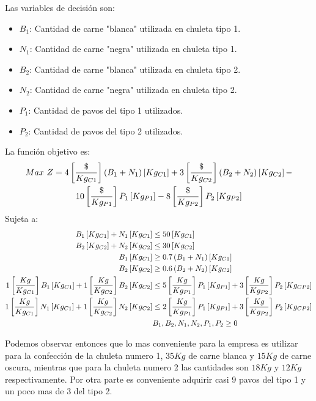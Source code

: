 \documentclass{tarea}
\begin{document}
\begin{homeworkProblem}[-1][Turkeyco]
Las variables de decisión son:
\begin{itemize}
	\item $B_1$: Cantidad de carne "blanca" utilizada en chuleta tipo 1.
	\item $N_1$: Cantidad de carne "negra" utilizada en chuleta tipo 1.
	\item $B_2$: Cantidad de carne "blanca" utilizada en chuleta tipo 2.
	\item $N_2$: Cantidad de carne "negra" utilizada en chuleta tipo 2.
	\item $P_1$: Cantidad de pavos del tipo 1 utilizados.
	\item $P_2$: Cantidad de pavos del tipo 2 utilizados.
\end{itemize}
La función objetivo es: 
\begin{multline}
	Max\ Z = 4\left[ \frac{\$}{Kg_{C1}} \right]\left( B_1 + N_1 \right)\left[ Kg_{C1} \right] +
	 3\left[ \frac{\$}{Kg_{C2}} \right]\left( B_2 + N_2 \right)\left[ Kg_{C2} \right] - \\
	  10\left[ \frac{\$}{Kg_{P1}} \right]P_1\left[ Kg_{P1} \right] -
	  8\left[ \frac{\$}{Kg_{P2}} \right]P_2\left[ Kg_{P2} \right]
\end{multline}
Sujeta a:
\begin{align*}
	B_1\left[ Kg_{C1} \right] + N_1\left[ Kg_{C1} \right] &\le 50\left[ Kg_{C1} \right] \\
	B_2\left[ Kg_{C2} \right] + N_2\left[ Kg_{C2} \right] &\le 30\left[ Kg_{C2} \right] \\
	B_1\left[ Kg_{C1} \right] &\ge 0.7\left( B_1 + N_1 \right)\left[ Kg_{C1} \right] \\
	B_2\left[ Kg_{C2} \right] &\ge 0.6\left( B_2 + N_2 \right)\left[ Kg_{C2} \right] \\
	1\left[ \frac{Kg}{Kg_{C1}} \right]B_1\left[ Kg_{C1} \right] + 1\left[ \frac{Kg}{Kg_{C2}} \right]B_2\left[ Kg_{C2} \right] &\le 5\left[ \frac{Kg}{Kg_{P1}} \right]P_1\left[ Kg_{P1} \right] + 3\left[ \frac{Kg}{Kg_{P2}} \right]P_2\left[ Kg_{CP2} \right]\\
	1\left[ \frac{Kg}{Kg_{C1}} \right]N_1\left[ Kg_{C1} \right] + 1\left[ \frac{Kg}{Kg_{C2}} \right]N_2\left[ Kg_{C2} \right] &\le 2\left[ \frac{Kg}{Kg_{P1}} \right]P_1\left[ Kg_{P1} \right] + 3\left[ \frac{Kg}{Kg_{P2}} \right]P_2\left[ Kg_{CP2} \right]\\
	&B_1,B_2,N_1,N_2,P_1,P_2 \ge 0
\end{align*}

Podemos observar entonces que lo mas conveniente para la empresa es utilizar para la confección de la chuleta numero 1, $35Kg$ de carne blanca y $15Kg$ de carne oscura, mientras que para la chuleta numero 2 las cantidades son $18Kg$ y $12Kg$ respectivamente. Por otra parte es conveniente adquirir casi 9 pavos del tipo 1 y un poco mas de 3 del tipo 2.

\end{homeworkProblem}
\end{document}
